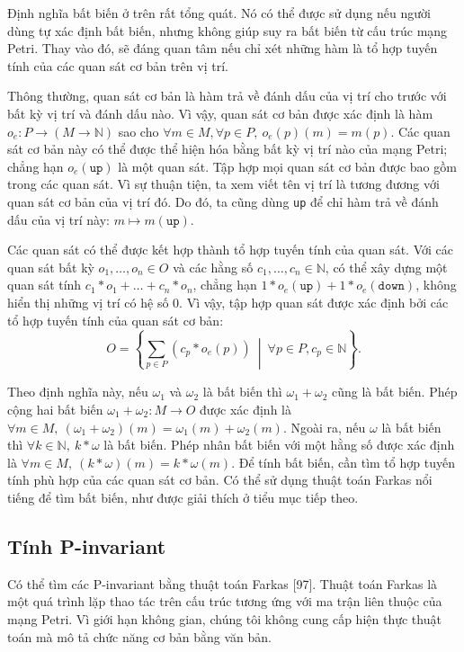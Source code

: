 Định nghĩa bất biến ở trên rất tổng quát. Nó có thể được sử dụng nếu người dùng tự xác định bất biến, nhưng không giúp suy ra bất biến từ cấu trúc mạng Petri. Thay vào đó, sẽ đáng quan tâm nếu chỉ xét những hàm là tổ hợp tuyến tính của các quan sát cơ bản trên vị trí.

Thông thường, quan sát cơ bản là hàm trả về đánh dấu của vị trí cho trước với bất kỳ vị trí và đánh dấu nào. Vì vậy, quan sát cơ bản được xác định là hàm $o_e:P\to(M\to\mathbb{N})$ sao cho $\forall m\in M,\forall p\in P,\ o_e(p)(m)=m(p)$. Các quan sát cơ bản này có thể được thể hiện hóa bằng bất kỳ vị trí nào của mạng Petri; chẳng hạn $o_e(\texttt{up})$ là một quan sát. Tập hợp mọi quan sát cơ bản được bao gồm trong các quan sát. Vì sự thuận tiện, ta xem viết tên vị trí là tương đương với quan sát cơ bản của vị trí đó. Do đó, ta cũng dùng \texttt{up} để chỉ hàm trả về đánh dấu của vị trí này: $m\mapsto m(\texttt{up})$.

Các quan sát có thể được kết hợp thành tổ hợp tuyến tính của quan sát. Với các quan sát bất kỳ $o_1,\ldots,o_n\in O$ và các hằng số $c_1,\ldots,c_n\in\mathbb{N}$, có thể xây dựng một quan sát tính $c_1*o_1+\ldots+c_n*o_n$, chẳng hạn $1*o_e(\texttt{up})+1*o_e(\texttt{down})$, không hiển thị những vị trí có hệ số 0. Vì vậy, tập hợp quan sát được xác định bởi các tổ hợp tuyến tính của quan sát cơ bản:
\[
O=\left\{\sum_{p\in P}(c_p*o_e(p))\ \middle|\ \forall p\in P,c_p\in\mathbb{N}\right\}.
\]

Theo định nghĩa này, nếu $\omega_1$ và $\omega_2$ là bất biến thì $\omega_1+\omega_2$ cũng là bất biến. Phép cộng hai bất biến $\omega_1+\omega_2:M\to O$ được xác định là $\forall m\in M,\ (\omega_1+\omega_2)(m)=\omega_1(m)+\omega_2(m)$. Ngoài ra, nếu $\omega$ là bất biến thì $\forall k\in\mathbb{N},\ k*\omega$ là bất biến. Phép nhân bất biến với một hằng số được xác định là $\forall m\in M,\ (k*\omega)(m)=k*\omega(m)$. Để tính bất biến, cần tìm tổ hợp tuyến tính phù hợp của các quan sát cơ bản. Có thể sử dụng thuật toán Farkas nổi tiếng để tìm bất biến, như được giải thích ở tiểu mục tiếp theo.

\subsection{Tính P-invariant}
Có thể tìm các P-invariant bằng thuật toán Farkas [97]. Thuật toán Farkas là một quá trình lặp thao tác trên cấu trúc tương ứng với ma trận liên thuộc của mạng Petri. Vì giới hạn không gian, chúng tôi không cung cấp hiện thực thuật toán mà mô tả chức năng cơ bản bằng văn bản.

